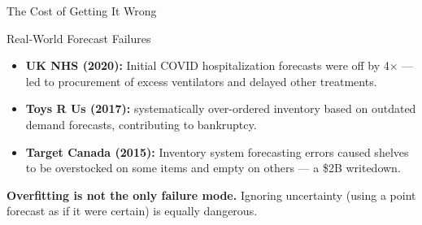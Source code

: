\documentclass[aspectratio=169, 11pt]{beamer}
\begin{document}
\begin{frame}{The Cost of Getting It Wrong}
  \begin{examplebox}{Real-World Forecast Failures}
    \begin{itemize}
      \item \textbf{UK NHS (2020):} Initial COVID hospitalization forecasts were off by 4$\times$ ---
            led to procurement of excess ventilators and delayed other treatments.
      \item \textbf{Toys R Us (2017):} systematically over-ordered inventory based on outdated
            demand forecasts, contributing to bankruptcy.
      \item \textbf{Target Canada (2015):} Inventory system forecasting errors caused shelves
            to be overstocked on some items and empty on others --- a \$2B writedown.
    \end{itemize}
  \end{examplebox}
  \vspace{0.3cm}
  \begin{warningbox}
    \textbf{Overfitting is not the only failure mode.}
    Ignoring uncertainty (using a point forecast as if it were certain)
    is equally dangerous.
  \end{warningbox}
\end{frame}
\end{document}

